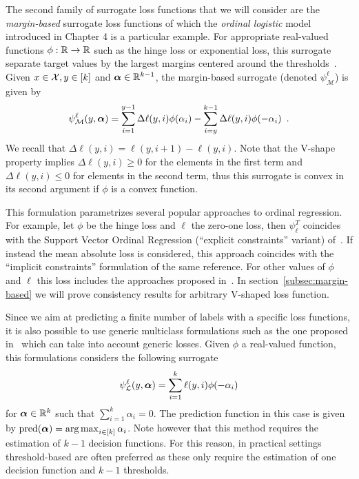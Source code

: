 The second family of surrogate loss functions that we will consider are the \emph{margin-based} surrogate loss functions of which the \emph{ordinal logistic} model introduced in Chapter 4 is a particular example. For appropriate real-valued functions $\phi: {\mathbb R} \to {\mathbb R}$ such as the hinge loss or exponential loss, this surrogate separate target values by the largest margins centered around the thresholds~\citep{lin2006large}. Given $x \in \mathcal{X}, y \in [k]$ and $\boldsymbol \alpha \in {\mathbb R}^{k-1}$, the margin-based surrogate (denoted $\psi^{\ell}_{\mathcal{M}}$) is given by
\begin{gather*}
\label{eq:sum_of_loss}
\psi^{\ell}_{\mathcal{M}}(y, \balpha) =
\sum_{i = 1}^{y-1} \Delta \ell(y, i)\phi(\alpha_i) - \sum_{i=y}^{k-1}\Delta \ell(y, i)\phi(-\alpha_i) \enspace.
\end{gather*}
We recall that $\Delta\ell(y, i) = \ell(y,i+1) - \ell(y, i)$. Note that the V-shape property implies $\Delta\ell(y, i) \geq 0$ for the elements in the first term and $\Delta\ell(y, i) \leq 0$ for elements in the second term, thus this surrogate is convex in its second argument if $\phi$ is a convex function.


This formulation parametrizes several popular approaches to ordinal regression. For example, let $\phi$ be the hinge loss and $\ell$ the zero-one loss, then $\psi^{T}_{\ell}$ coincides with the Support Vector Ordinal Regression (``explicit constraints'' variant) of~\citep{Shashua, Chu2007}. If instead the mean absolute loss is considered, this approach coincides with the ``implicit constraints'' formulation of the same reference. For other values of $\phi$ and $\ell$ this loss includes the approaches proposed in~\citep{Shashua,Keerthi2003,Rennie,lin2006large}. In section~\ref{subsec:margin-based} we will prove consistency results for arbitrary V-shaped loss function.


Since we aim at predicting a finite number of labels with a specific loss functions, it is also possible to use generic multiclass formulations such as the one proposed in~\citep{lee2004multicategory} which can take into account generic losses. Given $\phi$ a real-valued function, this formulations considers the following surrogate
\begin{equation} \label{eq:multiclass}
\psi_{\mathcal{L}}^{\ell}(y, \balpha) = \sum_{i=1}^k \ell(y, i) \phi(-\alpha_i)
\end{equation}
for $\boldsymbol \alpha \in {\mathbb R}^k$ such that $\sum_{i=1}^k \alpha_i = 0$. The prediction function in this case is given by ${\rm pred}(\boldsymbol \alpha) = \operatorname*{arg\,max}_{i \in [k]} \alpha_i$. Note however that this method requires the estimation of $k-1$ decision functions. For this reason, in practical settings threshold-based are often preferred as these only require the estimation of one decision function and $k-1$ thresholds.


